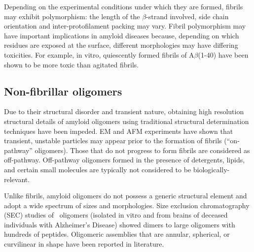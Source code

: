 Depending on the experimental conditions under which they are formed, fibrils may exhibit polymorphism: the length of the $\beta$-strand involved, side chain orientation and inter-protofilament packing may vary.\cite{Kodali:2007cz} Fibril polymorphism may have important implications in amyloid diseases because, depending on which residues are exposed at the surface, different morphologies may have differing toxicities. For example, in vitro, quiescently formed fibrils of A$\beta$(1-40) have been shown to be more toxic than agitated fibrils.\cite{Petkova:2005p4688} 



\subsection{Non-fibrillar oligomers}

Due to their structural disorder and transient nature, obtaining high resolution structural details of amyloid oligomers using traditional structural determination techniques have been impeded.  EM and AFM experiments have shown that transient, unstable particles may appear prior to the formation of fibrils (``on-pathway'' oligomers).\cite{Chromy:2003p2575,Ahmed:2010p5694,Caughey:2003jq} Those that do not progress to form fibrils are considered as off-pathway.\cite{Kayed:2003en} Off-pathway oligomers formed in the presence of detergents, lipids, and certain small molecules are typically not considered to be biologically-relevant.\cite{Yu:2009p2873,Laurents:2005ki}

Unlike fibrils, amyloid oligomers do not possess a generic structural element and adopt a wide spectrum of sizes and morphologies. Size exclusion chromatography (SEC) studies of \ oligomers (isolated in vitro and from brains of deceased individuals with Alzheimer's Disease) showed dimers to large oligomers with hundreds of peptides.\cite{Haass:2007db,Walsh:2007fu} Oligomeric assemblies that are annular, spherical, or curvilinear in shape have been reported in literature.\cite{Haass:2007db,Kim:2009p2715,Lashuel:2002eg}


